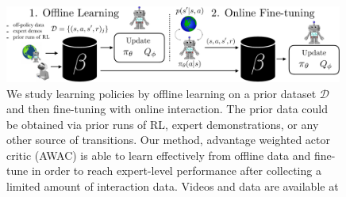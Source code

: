 \setlength{\tabcolsep}{6pt}
\renewcommand{\arraystretch}{1.5}
\begin{figure}[!t]
    \includegraphics[width=0.99\textwidth]{awac/figures/fig1v2-crop.pdf}
    \caption{
    We study learning policies by offline learning on a prior dataset $\mathcal{D}$ and then fine-tuning with online interaction. The prior data could be obtained via prior runs of RL, expert demonstrations, or any other source of transitions. Our method, advantage weighted actor critic (AWAC) is able to learn effectively from offline data and fine-tune in order to reach expert-level performance after collecting a limited amount of interaction data.
    Videos and data are available at \projectpage
    }
    \label{fig:figure1}
\end{figure}